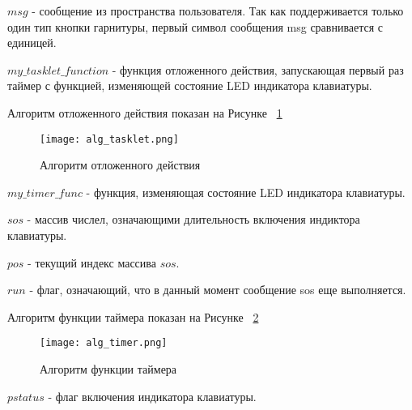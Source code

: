 $msg$ - сообщение из пространства пользователя. Так как поддерживается только один тип кнопки гарнитуры, первый символ сообщения msg сравнивается с единицей.

$my\_tasklet\_function$ - функция отложенного действия, запускающая первый раз таймер с функцией, изменяющей состояние LED индикатора клавиатуры.

Алгоритм отложенного действия показан на Рисунке ~\ref{image:alg_tasklet}

\begin{figure}[h]
  \centering
  \texttt{[image: alg\_tasklet.png]}
  \caption{Алгоритм отложенного действия}
  \label{image:alg_tasklet}
\end{figure}

$my\_timer\_func$ - функция, изменяющая состояние LED индикатора клавиатуры.

$sos$ - массив числел, означающими длительность включения индиктора клавиатуры.

$pos$ - текущий индекс массива $sos$.

$run$ - флаг, означающий, что в данный момент сообщение sos еще выполняется.

Алгоритм функции таймера показан на Рисунке ~\ref{image:alg_timer}

\begin{figure}[h]
  \centering
  \texttt{[image: alg\_timer.png]}
  \caption{Алгоритм функции таймера}
  \label{image:alg_timer}
\end{figure}

$pstatus$ - флаг включения индикатора клавиатуры.



